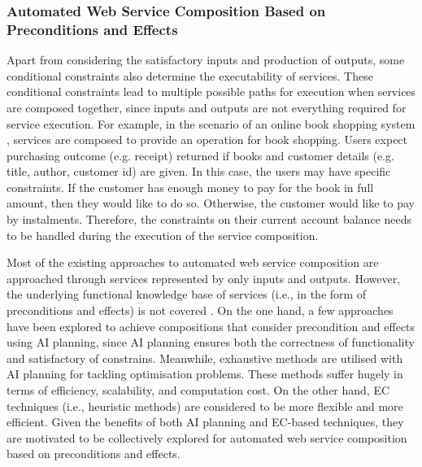\subsubsection{Automated Web Service Composition Based on Preconditions and Effects}
Apart from considering the satisfactory inputs and production of outputs, some conditional constraints also determine the executability of services.  These conditional constraints lead to multiple possible paths for execution when services are composed together, since inputs and outputs are not everything required for service execution. For example, in the scenario of an online book shopping system \cite{wang2014automated}, services are composed to provide an operation for book shopping.  Users expect purchasing outcome (e.g. receipt) returned if books and customer details (e.g. title, author, customer id) are given. In this case, the users may have specific constraints. If the customer has enough money to pay for the book in full amount, then they would like to do so. Otherwise, the customer would like to pay by instalments. Therefore, the constraints on their current account balance needs to be handled during the execution of the service composition.

Most of the existing approaches to automated web service composition are approached through services represented by only inputs and outputs. However, the underlying functional knowledge base of services (i.e., in the form of preconditions and effects) is not covered \cite{paliwal2012semantics}. On the one hand, a few approaches \cite{bansal2016generalized,DBLP:journals/soca/BoustilMS14} have been explored to achieve compositions that consider precondition and effects using AI planning, since AI planning ensures both the correctness of functionality and satisfactory of constrains. Meanwhile, exhaustive methods are utilised with AI planning for tackling optimisation problems. These methods suffer hugely in terms of efficiency, scalability, and computation cost. On the other hand, EC techniques (i.e., heuristic methods) are considered to be more flexible and more efficient. Given the benefits of both AI planning and EC-based techniques, they are motivated to be collectively explored for automated web service composition based on preconditions and effects.
 
